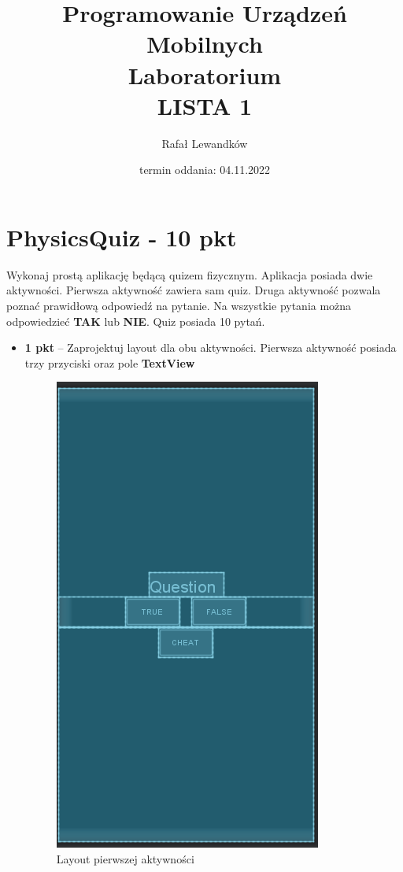 \documentclass[a4paper]{article}
\title{Programowanie Urządzeń Mobilnych \\ Laboratorium \\ \textbf{LISTA 1}}
\author{Rafał Lewandków}
\date{termin oddania: 04.11.2022}
\begin{document}
\maketitle
    

\section*{PhysicsQuiz - 10 pkt}

Wykonaj prostą aplikację będącą quizem fizycznym. Aplikacja posiada dwie aktywności. Pierwsza aktywność zawiera sam quiz. Druga aktywność pozwala poznać prawidłową odpowiedź na pytanie. Na wszystkie pytania można odpowiedzieć \textbf{TAK} lub \textbf{NIE}. Quiz posiada 10 pytań.

\begin{itemize}
\item \textbf{1 pkt} -- Zaprojektuj layout dla obu aktywności. Pierwsza aktywność posiada trzy przyciski oraz pole \textbf{TextView}

\begin{figure}[h]
\centering
\caption{Layout pierwszej aktywności}
\includegraphics[scale=0.7]{l1.png}
\end{figure}


\end{itemize}
\end{document}
